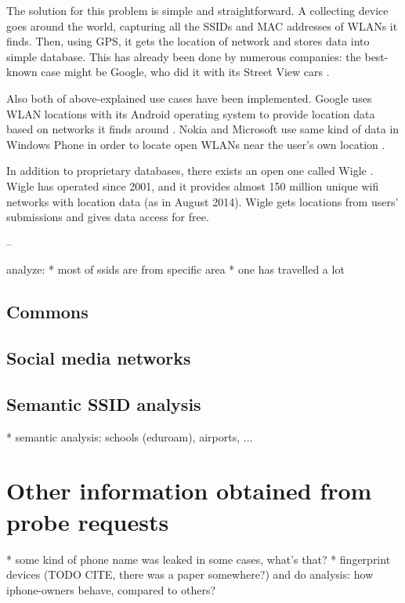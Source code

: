 \documentclass[12pt,a4paper,oneside,pdftex]{report}
\begin{document}
The solution for this problem is simple and straightforward. A collecting device goes around the world, capturing all the SSIDs and MAC addresses of WLANs it finds. Then, using GPS, it gets the location of network and stores data into simple database. This has already been done by numerous companies: the best-known case might be Google, who did it with its Street View cars \cite{google_wifi_collection}.

Also both of above-explained use cases have been implemented. Google uses WLAN locations with its Android operating system to provide location data based on networks it finds around \cite{google_wifi_collection}. Nokia and Microsoft use same kind of data in Windows Phone in order to locate open WLANs near the user's own location \cite{nokia_datasense}.

In addition to proprietary databases, there exists an open one called Wigle \cite{wigle}. Wigle has operated since 2001, and it provides almost 150 million unique wifi networks with location data (as in August 2014). Wigle gets locations from users' submissions and gives data access for free. 

--

analyze: 
* most of ssids are from specific area
* one has travelled a lot

\subsection{Commons}
\label{subsec:ssid_commons}

\subsection{Social media networks}
\label{subsec:social_media}

\subsection{Semantic SSID analysis}
* semantic analysis: schools (eduroam), airports, ...

\section{Other information obtained from probe requests}
\label{sec:other_info}

* some kind of phone name was leaked in some cases, what's that?
* fingerprint devices (TODO CITE, there was a paper somewhere?) and do analysis: how iphone-owners behave, compared to others?
\end{document}
